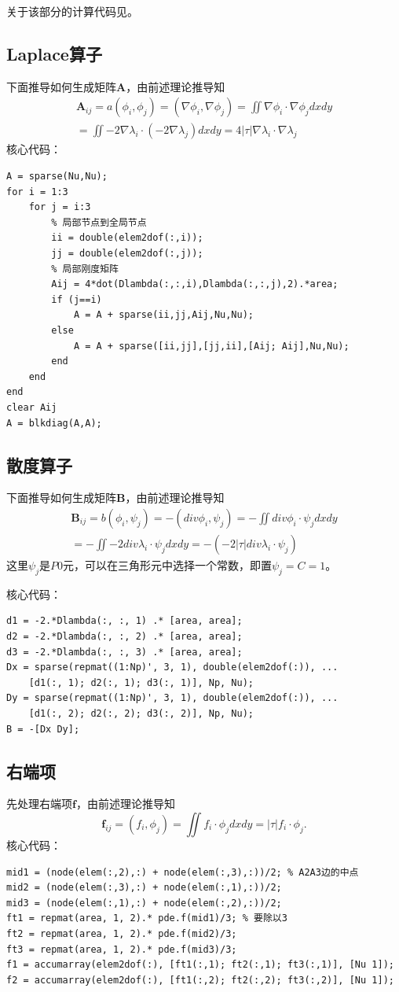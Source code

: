 \documentclass{ctexart}
\begin{document}
关于该部分的计算代码见\cite{iFEM}。
\subsection{Laplace算子}
下面推导如何生成矩阵$\mathbf{A}$，由前述理论推导知
\begin{gather*}
    \mathbf{A}_{ij}=a(\phi_i,\phi_j)=(\nabla \phi_i,\nabla \phi_j)
    =\iint\nabla \phi_i \cdot \nabla \phi_jdxdy\\
    =\iint-2\nabla \lambda _i\cdot (-2\nabla \lambda _j)dxdy
    = 4 |\tau |\nabla \lambda _i\cdot \nabla \lambda _j
\end{gather*}
核心代码：
\begin{lstlisting}
A = sparse(Nu,Nu);
for i = 1:3
    for j = i:3
        % 局部节点到全局节点
        ii = double(elem2dof(:,i));
        jj = double(elem2dof(:,j));
        % 局部刚度矩阵
        Aij = 4*dot(Dlambda(:,:,i),Dlambda(:,:,j),2).*area;
        if (j==i)
            A = A + sparse(ii,jj,Aij,Nu,Nu);
        else
            A = A + sparse([ii,jj],[jj,ii],[Aij; Aij],Nu,Nu);
        end
    end
end
clear Aij
A = blkdiag(A,A);
\end{lstlisting}


\subsection{散度算子}
下面推导如何生成矩阵$\mathbf{B}$，由前述理论推导知
\begin{gather*}
    \mathbf{B}_{ij}=b(\phi_i,\psi_j)=-(div \phi_i, \psi_j)
    =-\iint div \phi_i\cdot\psi_jdxdy\\
    =-\iint-2div\lambda _i\cdot \psi_jdxdy
    = -(-2|\tau|div \lambda_i \cdot \psi_j)
\end{gather*}
这里$\psi_j$是$P0$元，可以在三角形元中选择一个常数，即置$\psi_j=C=1$。

核心代码：
\begin{lstlisting}
d1 = -2.*Dlambda(:, :, 1) .* [area, area];
d2 = -2.*Dlambda(:, :, 2) .* [area, area];
d3 = -2.*Dlambda(:, :, 3) .* [area, area];
Dx = sparse(repmat((1:Np)', 3, 1), double(elem2dof(:)), ...
    [d1(:, 1); d2(:, 1); d3(:, 1)], Np, Nu);
Dy = sparse(repmat((1:Np)', 3, 1), double(elem2dof(:)), ...
    [d1(:, 2); d2(:, 2); d3(:, 2)], Np, Nu);
B = -[Dx Dy];
\end{lstlisting}


\subsection{右端项}
先处理右端项$\mathbf{f}$，由前述理论推导知
$$
\mathbf{f}_{ij}=(f_i,\phi_j)=\iint f_i \cdot \phi_j dxdy
=|\tau|f_i \cdot \phi_j.
$$
核心代码：
\begin{lstlisting}
mid1 = (node(elem(:,2),:) + node(elem(:,3),:))/2; % A2A3边的中点
mid2 = (node(elem(:,3),:) + node(elem(:,1),:))/2;
mid3 = (node(elem(:,1),:) + node(elem(:,2),:))/2;
ft1 = repmat(area, 1, 2).* pde.f(mid1)/3; % 要除以3
ft2 = repmat(area, 1, 2).* pde.f(mid2)/3;
ft3 = repmat(area, 1, 2).* pde.f(mid3)/3;
f1 = accumarray(elem2dof(:), [ft1(:,1); ft2(:,1); ft3(:,1)], [Nu 1]);
f2 = accumarray(elem2dof(:), [ft1(:,2); ft2(:,2); ft3(:,2)], [Nu 1]);
\end{lstlisting}
\end{document}
